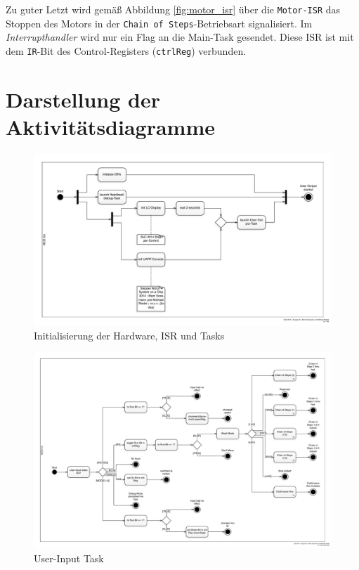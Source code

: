 \documentclass[ngerman,fontsize=12pt , paper=a4 , twoside=false , DIV12 , BCOR=1cm ,
numbers=enddot , listof=totoc , bibliography=totoc , index=totoc ,
headings=small , headlines=1.5 , final]{scrbook}
\begin{document}
Zu guter Letzt wird gemäß Abbildung \ref{fig:motor_isr} über die
\lstinline!Motor-ISR! das Stoppen des Motors in der
\lstinline!Chain of Steps!-Betriebsart signalisiert. Im
\emph{Interrupthandler} wird nur ein Flag an die Main-Task gesendet.
Diese ISR ist mit dem \lstinline!IR!-Bit des Control-Registers
(\lstinline!ctrlReg!) verbunden.

\section{Darstellung der
Aktivitätsdiagramme}\label{darstellung-der-aktivituxe4tsdiagramme}

\begin{figure}[htbp]
\centering
\includegraphics{../Diagrams/Activities/Functions/Init.pdf}
\caption{Initialisierung der Hardware, ISR und Tasks\label{fig:init}}
\end{figure}

\begin{figure}[htbp]
\centering
\includegraphics{../Diagrams/Activities/Tasks/User-Input.pdf}
\caption{User-Input Task\label{fig:user_input}}
\end{figure}
\end{document}
